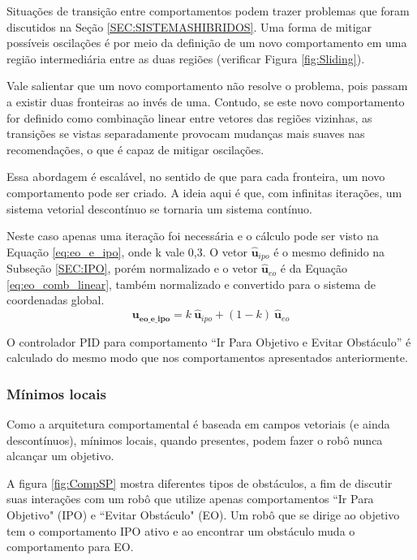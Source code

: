 		Situações de transição entre comportamentos podem trazer problemas que foram discutidos 
		na Seção \ref{SEC:SISTEMASHIBRIDOS}. Uma forma de mitigar possíveis oscilações é por meio da definição de um novo 
		comportamento em uma região intermediária entre as duas regiões (verificar 
		Figura \ref{fig:Sliding}).
		
		Vale salientar que um novo comportamento não resolve o problema, pois passam a existir 
		duas fronteiras ao invés de uma. Contudo, se este novo comportamento for definido como 
		combinação linear entre vetores das regiões vizinhas, as transições se vistas separadamente
		provocam mudanças mais suaves nas recomendações, o que é capaz de mitigar oscilações.
		
		Essa abordagem é escalável, no sentido de que para cada fronteira, um novo comportamento
		pode ser criado. A ideia aqui é que, com infinitas iterações, um sistema vetorial 
		descontínuo se tornaria um sistema contínuo.
		
		Neste caso apenas uma iteração foi necessária e o cálculo pode ser visto na Equação 
		\ref{eq:eo_e_ipo}, onde k vale 0,3. O vetor $\hat{\mathbf{u}}_{ipo}$ é o mesmo definido
		na Subseção \ref{SEC:IPO}, porém normalizado e o vetor $\hat{\mathbf{u}}_{eo}$ é da 
		Equação \ref{eq:eo_comb_linear}, também normalizado e convertido para o sistema de
		coordenadas global.		
		\begin{equation}
			\label{eq:eo_e_ipo}
			\mathbf{u_{eo\_e\_ipo}} = k \ \hat{\mathbf{u}}_{ipo} + (1-k) \ \hat{\mathbf{u}}_{eo}
		\end{equation}
		
		O controlador PID para comportamento ``Ir Para Objetivo e Evitar Obstáculo'' é calculado 
		do mesmo modo que nos comportamentos apresentados anteriormente.
		
		\subsubsection{Mínimos locais}
		
		Como a arquitetura comportamental é baseada em campos vetoriais (e ainda descontínuos),
		mínimos locais, quando presentes, podem fazer o robô nunca alcançar um objetivo. 
		
		A figura \ref{fig:CompSP} mostra diferentes tipos de obstáculos, a fim de discutir 
		suas interações com um robô que utilize apenas comportamentos ``Ir Para Objetivo" (IPO) e 
		``Evitar Obstáculo" (EO). Um robô que se dirige ao objetivo tem o comportamento IPO ativo
		e ao encontrar um obstáculo muda o comportamento para EO. 
		
